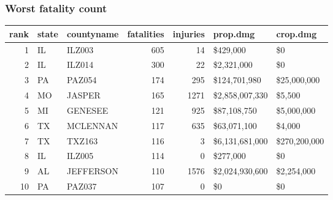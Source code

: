 \documentclass[]{article}
\newenvironment{Shaded}{\begin{snugshade}}{\end{snugshade}}
\newcommand{\KeywordTok}[1]{\textcolor[rgb]{0.13,0.29,0.53}{\textbf{{#1}}}}
\newcommand{\DataTypeTok}[1]{\textcolor[rgb]{0.13,0.29,0.53}{{#1}}}
\newcommand{\DecValTok}[1]{\textcolor[rgb]{0.00,0.00,0.81}{{#1}}}
\newcommand{\StringTok}[1]{\textcolor[rgb]{0.31,0.60,0.02}{{#1}}}
\newcommand{\NormalTok}[1]{{#1}}
\begin{document}
\subsubsection{Worst fatality count}\label{worst-fatality-count}

\begin{Shaded}
\end{Shaded}

\begin{longtable}[]{@{}rllrrll@{}}
\toprule
rank & state & countyname & fatalities & injuries & prop.dmg &
crop.dmg\tabularnewline
\midrule
\endhead
1 & IL & ILZ003 & 605 & 14 & \$429,000 & \$0\tabularnewline
2 & IL & ILZ014 & 300 & 22 & \$2,321,000 & \$0\tabularnewline
3 & PA & PAZ054 & 174 & 295 & \$124,701,980 &
\$25,000,000\tabularnewline
4 & MO & JASPER & 165 & 1271 & \$2,858,007,330 & \$5,500\tabularnewline
5 & MI & GENESEE & 121 & 925 & \$87,108,750 & \$5,000,000\tabularnewline
6 & TX & MCLENNAN & 117 & 635 & \$63,071,100 & \$4,000\tabularnewline
7 & TX & TXZ163 & 116 & 3 & \$6,131,681,000 &
\$270,200,000\tabularnewline
8 & IL & ILZ005 & 114 & 0 & \$277,000 & \$0\tabularnewline
9 & AL & JEFFERSON & 110 & 1576 & \$2,024,930,600 &
\$2,254,000\tabularnewline
10 & PA & PAZ037 & 107 & 0 & \$0 & \$0\tabularnewline
\bottomrule
\end{longtable}

\begin{Shaded}
\end{Shaded}
\end{document}
